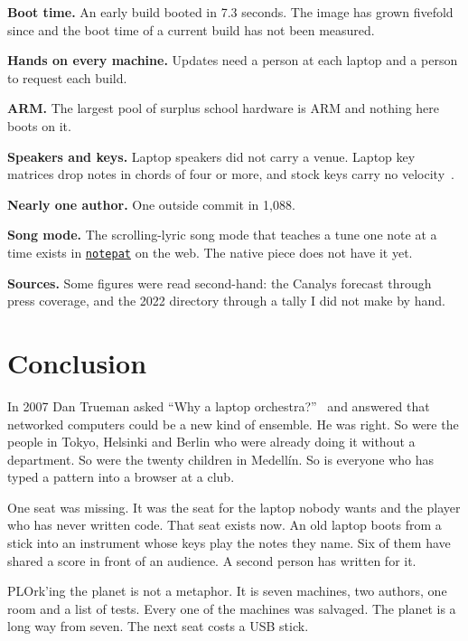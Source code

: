 \documentclass[10pt,letterpaper,twocolumn]{article}
\newcommand{\np}{\href{https://notepat.com}{\texttt{notepat}}}
\begin{document}
\textbf{Boot time.} An early build booted in 7.3 seconds. The image has grown fivefold since and the boot time of a current build has not been measured.

\textbf{Hands on every machine.} Updates need a person at each laptop and a person to request each build.

\textbf{ARM.} The largest pool of surplus school hardware is ARM and nothing here boots on it.

\textbf{Speakers and keys.} Laptop speakers did not carry a venue. Laptop key matrices drop notes in chords of four or more, and stock keys carry no velocity~\citep{scudder2026laptop}.

\textbf{Nearly one author.} One outside commit in 1,088.

\textbf{Song mode.} The scrolling-lyric song mode that teaches a tune one note at a time exists in \np{} on the web. The native piece does not have it yet.

\textbf{Sources.} Some figures were read second-hand: the Canalys forecast through press coverage, and the 2022 directory through a tally I did not make by hand.


\section{Conclusion}

In 2007 Dan Trueman asked ``Why a laptop orchestra?''~\citep{trueman2007why} and answered that networked computers could be a new kind of ensemble. He was right. So were the people in Tokyo, Helsinki and Berlin who were already doing it without a department. So were the twenty children in Medell\'{i}n. So is everyone who has typed a pattern into a browser at a club.

One seat was missing. It was the seat for the laptop nobody wants and the player who has never written code. That seat exists now. An old laptop boots from a stick into an instrument whose keys play the notes they name. Six of them have shared a score in front of an audience. A second person has written for it.

PLOrk'ing the planet is not a metaphor. It is seven machines, two authors, one room and a list of tests. Every one of the machines was salvaged. The planet is a long way from seven. The next seat costs a USB stick.

\end{document}

